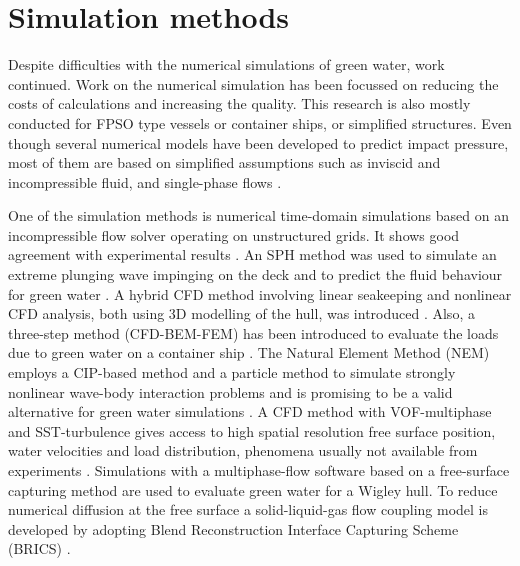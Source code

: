 \section{Simulation methods}
\label{sec:lit_sim_green_water}
Despite difficulties with the numerical simulations of green water, work continued. Work on the numerical simulation has been focussed on reducing the costs of calculations and increasing the quality. This research is also mostly conducted for FPSO type vessels or container ships, or simplified structures. 
Even though several numerical models have been developed to predict impact pressure, most of them are based on simplified assumptions such as inviscid and incompressible fluid, and single-phase flows \cite{Ariyarathne2012}. 
\par 
One of the simulation methods is numerical time-domain simulations based on an incompressible flow solver operating on unstructured grids. It shows good agreement with experimental results \cite{Lu2012}. An SPH method was used to simulate an extreme plunging wave impinging on the deck \cite{Soares2015} and to predict the fluid behaviour for green water \cite{LeTouze2010}. A hybrid CFD method involving linear seakeeping and nonlinear CFD analysis, both using 3D modelling of the hull, was introduced \cite{Kim2013}. Also, a three-step method (CFD-BEM-FEM) has been introduced to evaluate the loads due to green water on a container ship \cite{Kudupudi2019}. The Natural Element Method (NEM) employs a CIP-based method and a particle method to simulate strongly nonlinear wave-body interaction problems and is promising to be a valid alternative for green water simulations \cite{Hu2010}.
A CFD method with VOF-multiphase and SST-turbulence gives access to
high spatial resolution free surface position, water velocities and load distribution, phenomena usually not available from experiments \cite{Mandate2018}. Simulations with a multiphase-flow software based on a free-surface capturing method are used to evaluate green water for a Wigley hull. To reduce numerical diffusion at the free surface a solid-liquid-gas flow coupling model is developed by adopting Blend Reconstruction Interface Capturing Scheme (BRICS) \cite{He2017}.
\par 
